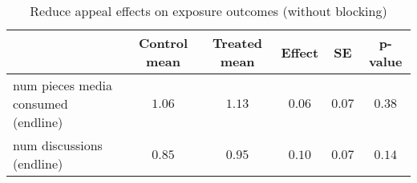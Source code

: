 \begin{table*}[ht]
\caption{Reduce appeal effects on exposure outcomes (without blocking)\label{round}} 
\begin{center}
\begin{tabular}{lccccc}
\hline\hline
\multicolumn{1}{l}{}&\multicolumn{1}{c}{Control mean}&\multicolumn{1}{c}{Treated mean}&\multicolumn{1}{c}{Effect}&\multicolumn{1}{c}{SE}&\multicolumn{1}{c}{p-value}\tabularnewline
\hline
num pieces media consumed (endline)&$1.06$&$1.13$&$0.06$&$0.07$&$0.38$\tabularnewline
num discussions (endline)&$0.85$&$0.95$&$0.10$&$0.07$&$0.14$\tabularnewline
\hline
\end{tabular}\end{center}

\end{table*}

